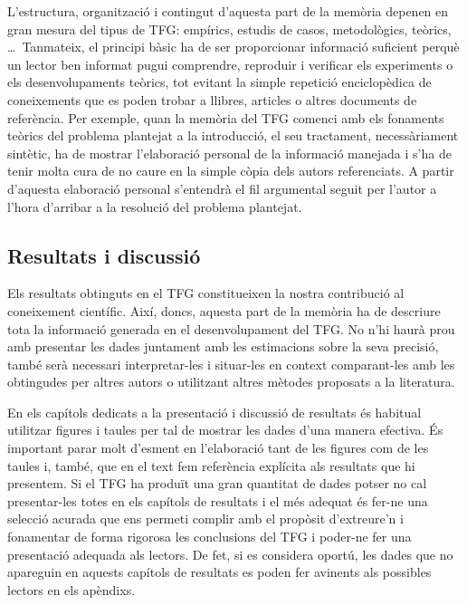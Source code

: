 L'estructura, organització i contingut d'aquesta part de la memòria depenen en gran mesura del tipus de \ac{TFG}: empírics, estudis de casos, metodològics, teòrics, \ldots\ Tanmateix, el principi bàsic ha de ser proporcionar informació suficient perquè un lector ben informat pugui comprendre, reproduir i verificar els experiments o els desenvolupaments teòrics, tot evitant la simple repetició enciclopèdica de coneixements que es poden trobar a llibres, articles o altres documents de referència. Per exemple, quan la memòria del \ac{TFG} comenci amb els fonaments teòrics del problema plantejat a la introducció, el seu tractament, necessàriament sintètic, ha de mostrar l'elaboració personal de la informació manejada i s'ha de tenir molta cura de no caure en la simple còpia dels autors referenciats. A partir d'aquesta elaboració personal s'entendrà el fil argumental seguit per l'autor a l'hora d'arribar a la resolució del problema plantejat.

\subsection{Resultats i discussió}

Els resultats obtinguts en el \ac{TFG} constitueixen la nostra contribució al coneixement científic. Així, doncs, aquesta part de la memòria ha de descriure tota la informació generada en el desenvolupament del \ac{TFG}. No n'hi haurà prou amb presentar les dades juntament amb les estimacions sobre la seva precisió, també serà necessari interpretar-les i situar-les en context comparant-les amb les obtingudes per altres autors o utilitzant altres mètodes proposats a la literatura.

En els capítols dedicats a la presentació i discussió de resultats és habitual utilitzar figures i taules per tal de mostrar les dades d'una manera efectiva. És important parar molt d'esment en l'elaboració tant de les figures com de les taules i, també, que en el text fem referència explícita als resultats que hi presentem. Si el \ac{TFG} ha produït una gran quantitat de dades potser no cal presentar-les totes en els capítols de resultats i el més adequat és fer-ne una selecció acurada que ens permeti complir amb el propòsit d'extreure'n i fonamentar de forma rigorosa les conclusions del \ac{TFG} i poder-ne fer una presentació adequada als lectors. De fet, si es considera oportú, les dades que no apareguin en aquests capítols de resultats es poden fer avinents als possibles lectors en els apèndixs.

